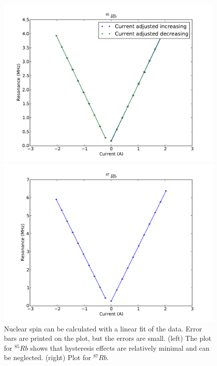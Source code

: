 \documentclass[11pt,letterpaper]{article}
\begin{document}
\begin{figure}
    \centering
    \begin{minipage}[t]{0.49\textwidth}
        \centering
        \includegraphics[width=\textwidth]{figures/rubidium85.pdf}
    \end{minipage}
    \begin{minipage}[t]{0.49\textwidth}
        \centering
        \includegraphics[width=\textwidth]{figures/rubidium87.pdf}
    \end{minipage}
    \caption{Nuclear spin can be calculated with a linear fit of the data. Error
        bars are printed on the plot, but the errors are small. (left) The plot
        for $^{85}Rb$ shows that hysteresis effects are relatively minimal and
        can be neglected. (right) Plot for $^{87}Rb$.}
    \label{currentfrequency}
\end{figure}
\end{document}
